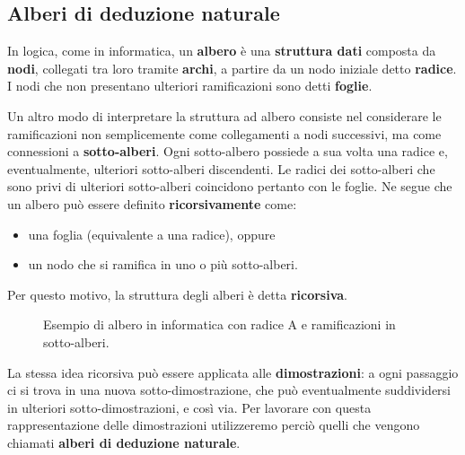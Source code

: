 \documentclass[
  a4paper,
]{article}
\begin{document}
\hypertarget{alberi-di-deduzione-naturale}{%
\subsection{Alberi di deduzione
naturale}\label{alberi-di-deduzione-naturale}}

In logica, come in informatica, un \textbf{albero} è una
\textbf{struttura dati} composta da \textbf{nodi}, collegati tra loro
tramite \textbf{archi}, a partire da un nodo iniziale detto
\textbf{radice}. I nodi che non presentano ulteriori ramificazioni sono
detti \textbf{foglie}.

Un altro modo di interpretare la struttura ad albero consiste nel
considerare le ramificazioni non semplicemente come collegamenti a nodi
successivi, ma come connessioni a \textbf{sotto-alberi}. Ogni
sotto-albero possiede a sua volta una radice e, eventualmente, ulteriori
sotto-alberi discendenti. Le radici dei sotto-alberi che sono privi di
ulteriori sotto-alberi coincidono pertanto con le foglie. Ne segue che
un albero può essere definito \textbf{ricorsivamente} come:

\begin{itemize}
\item
  una foglia (equivalente a una radice), oppure
\item
  un nodo che si ramifica in uno o più sotto-alberi.
\end{itemize}

Per questo motivo, la struttura degli alberi è detta \textbf{ricorsiva}.

\begin{figure}[h]
    \centering
    \caption{Esempio di albero in informatica con radice A e ramificazioni in sotto-alberi.}
\end{figure}

La stessa idea ricorsiva può essere applicata alle
\textbf{dimostrazioni}: a ogni passaggio ci si trova in una nuova
sotto-dimostrazione, che può eventualmente suddividersi in ulteriori
sotto-dimostrazioni, e così via. Per lavorare con questa
rappresentazione delle dimostrazioni utilizzeremo perciò quelli che
vengono chiamati \textbf{alberi di deduzione naturale}.
\end{document}
